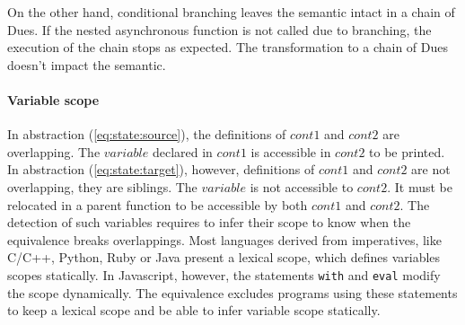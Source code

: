 On the other hand, conditional branching leaves the semantic intact in a chain of Dues.
If the nested asynchronous function is not called due to branching, the execution of the chain stops as expected. %
The transformation to a chain of Dues doesn't impact the semantic.

\paragraph{Variable scope}

In abstraction (\ref{eq:state:source}), the definitions of $cont1$ and $cont2$ are overlapping.
The $variable$ declared in $cont1$ is accessible in $cont2$ to be printed.
In abstraction (\ref{eq:state:target}), however, definitions of $cont1$ and $cont2$ are not overlapping, they are siblings.
The $variable$ is not accessible to $cont2$.
It must be relocated in a parent function to be accessible by both $cont1$ and $cont2$.
The detection of such variables requires to infer their scope to know when the equivalence breaks overlappings.
Most languages derived from imperatives, like C/C++, Python, Ruby or Java present a lexical scope, which defines variables scopes statically.
In Javascript, however, the statements \texttt{with} and \texttt{eval} modify the scope dynamically.
The equivalence excludes programs using these statements to keep a lexical scope and be able to infer variable scope statically.


